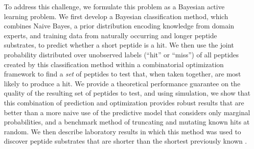 \documentclass[opre,nonblindrev]{informs3} %
\begin{document}




To address this challenge, we formulate this problem as a Bayesian active learning problem.  We first develop a Bayesian classification method, which combines Naive Bayes, a prior distribution encoding knowledge from domain experts, and training data from naturally occurring and longer peptide substrates, to predict whether a short peptide is a hit. We then use the joint probability distributed over unobserved labels (``hit'' or ``miss'') of all peptides created by this classification method within a combinatorial optimization framework to find a {\it set} of peptides to test that, when taken together, are most likely to produce a hit.  We provide a theoretical performance guarantee on the quality of the resulting set of peptides to test, and using simulation, we show that this combination of prediction and optimization provides robust results that are better than a more naive use of the predictive model that considers only marginal probabilities, and a benchmark method of truncating and mutating known hits at random. We then describe laboratory results in which this method was used to discover peptide substrates that are shorter than the shortest previously known \citep{ybbr}.


\end{document}
